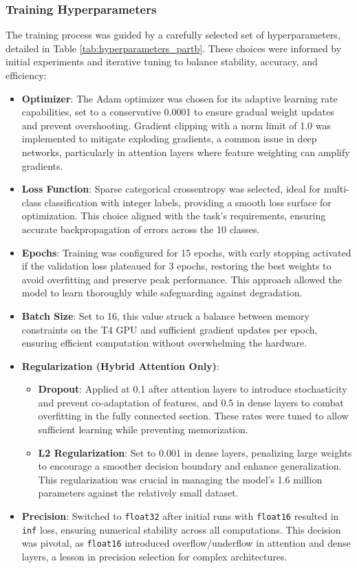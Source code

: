 \documentclass[12pt]{article}
\begin{document}
\subsubsection{Training Hyperparameters}
The training process was guided by a carefully selected set of hyperparameters, detailed in Table \ref{tab:hyperparameters_partb}. These choices were informed by initial experiments and iterative tuning to balance stability, accuracy, and efficiency:
\begin{itemize}
    \item \textbf{Optimizer}: The Adam optimizer was chosen for its adaptive learning rate capabilities, set to a conservative 0.0001 to ensure gradual weight updates and prevent overshooting. Gradient clipping with a norm limit of 1.0 was implemented to mitigate exploding gradients, a common issue in deep networks, particularly in attention layers where feature weighting can amplify gradients.
    \item \textbf{Loss Function}: Sparse categorical crossentropy was selected, ideal for multi-class classification with integer labels, providing a smooth loss surface for optimization. This choice aligned with the task's requirements, ensuring accurate backpropagation of errors across the 10 classes.
    \item \textbf{Epochs}: Training was configured for 15 epochs, with early stopping activated if the validation loss plateaued for 3 epochs, restoring the best weights to avoid overfitting and preserve peak performance. This approach allowed the model to learn thoroughly while safeguarding against degradation.
    \item \textbf{Batch Size}: Set to 16, this value struck a balance between memory constraints on the T4 GPU and sufficient gradient updates per epoch, ensuring efficient computation without overwhelming the hardware.
    \item \textbf{Regularization (Hybrid Attention Only)}:
        \begin{itemize}
            \item \textbf{Dropout}: Applied at 0.1 after attention layers to introduce stochasticity and prevent co-adaptation of features, and 0.5 in dense layers to combat overfitting in the fully connected section. These rates were tuned to allow sufficient learning while preventing memorization.
            \item \textbf{L2 Regularization}: Set to 0.001 in dense layers, penalizing large weights to encourage a smoother decision boundary and enhance generalization. This regularization was crucial in managing the model's 1.6 million parameters against the relatively small dataset.
        \end{itemize}
    \item \textbf{Precision}: Switched to \texttt{float32} after initial runs with \texttt{float16} resulted in \texttt{inf} loss, ensuring numerical stability across all computations. This decision was pivotal, as \texttt{float16} introduced overflow/underflow in attention and dense layers, a lesson in precision selection for complex architectures.
\end{itemize}
\end{document}
